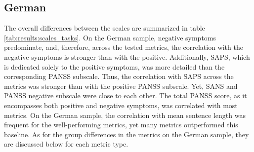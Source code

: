 \begin{table}[ht]
\captionsetup{width=\textwidth}
\caption[Scale and Task Effects]{\label{tab:results:scales_tasks} The number of metrics correlating above 0.3 with the target scale (or having pseudo r squared above 0.9) and either do not correlate with mean sentence length above the threshold of 0.3 or outperform this baseline metric. In parenthesis are the numbers of metrics not correlating with sentence length above 0.3.}
\end{table}

\subsection{German}
The overall differences between the scales are summarized in table \ref{tab:results:scales_tasks}. On the German sample, negative symptoms predominate, and, therefore, across the tested metrics, the correlation with the negative symptoms is stronger than with the positive. Additionally, SAPS, which is dedicated solely to the positive symptoms, was more detailed than the corresponding PANSS subscale. Thus, the correlation with SAPS across the metrics was stronger than with the positive PANSS subscale. Yet, SANS and PANSS negative subscale were close to each other. The total PANSS score, as it encompasses both positive and negative symptoms, was correlated with most metrics. On the German sample, the correlation with mean sentence length was frequent for the well-performing metrics, yet many metrics outperformed this baseline. As for the group differences in the metrics on the German sample, they are discussed below for each metric type. 

